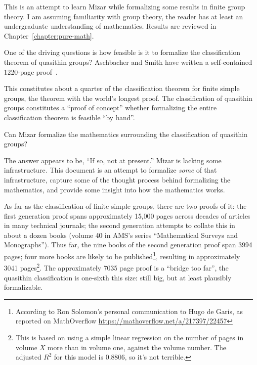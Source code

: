 \preface

\M
This is an attempt to learn Mizar while formalizing some results in
finite group theory. I am assuming familiarity with group theory, the
reader has at least an undergraduate understanding of mathematics.
Results are reviewed in Chapter~\ref{chapter:pure-math}.

One of the driving questions is how feasible is it to formalize the
classification theorem of quasithin groups? Aschbacher and Smith have
written a self-contained 1220-page
proof~\cite{aschbacher2004classification1,aschbacher2004classification2}.

This constitutes about a quarter of the classification theorem for
finite simple groups, the theorem with the world's longest proof. The
classification of quasithin groups constitutes a ``proof of concept''
whether formalizing the entire classification theorem is feasible ``by hand''.

\M
Can Mizar formalize the mathematics surrounding the classification of
quasithin groups?

The answer appears to be, ``If so, not at present.'' Mizar is lacking
some infrastructure. This document is an attempt to formalize
\emph{some} of that infrastructure, capture some of the thought process
behind formalizing the mathematics, and provide some insight into how
the mathematics works.

\M As far as the classification of finite simple groups, there are two
proofs of it: the first generation proof spans approximately {15,000}
pages across decades of articles in many technical journals; the second
generation attempts to collate this in about a dozen books (volume 40 in
AMS's series ``Mathematical Surveys and Monographs''). Thus far, the
nine books of the second generation proof span 3994 pages; four more
books are likely to be published\footnote{According to Ron Solomon's
personal communication to Hugo de Garis, as reported on MathOverflow \url{https://mathoverflow.net/a/217397/22457}}, resulting in approximately 3041
pages\footnote{This is based on using a simple linear regression on the
number of pages in volume $X$ more than in volume one, against the
volume number. The adjusted $R^{2}$ for this model is $0.8806$, so it's
not terrible.}. The approximately 7035 page proof is a ``bridge too
far'', the quasithin classification is one-sixth this size: still big,
but at least plausibly formalizable.


